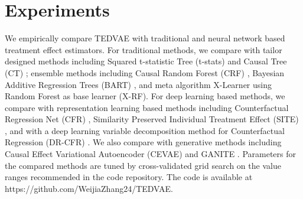 \documentclass[letterpaper]{article} %
\begin{document}
\section*{Experiments}
We empirically compare TEDVAE with traditional and neural network based treatment effect estimators.
For traditional methods, we compare with tailor designed methods including Squared t-statistic Tree (t-stats) \cite{Su2009} and Causal Tree (CT) \cite{Athey2015}; ensemble methods including Causal Random Forest (CRF) \cite{Wager2018}, Bayesian Additive Regression Trees (BART) \cite{Hill2011}, and meta algorithm X-Learner \cite{Kuenzel2019} using Random Forest \cite{Breiman1984} as base learner (X-RF).
For deep learning based methods, we compare with representation learning based methods including Counterfactual Regression Net (CFR) \cite{Shalit2016},
Similarity Preserved Individual Treatment Effect (SITE) \cite{Yao2018_Twin}, and with a deep learning variable decomposition method for Counterfactual Regression (DR-CFR) \cite{Hassanpour2020}.
We also compare with generative methods including Causal Effect Variational Autoencoder (CEVAE) \cite{Louizos2017} and GANITE \cite{Yoon2018}.
Parameters for the compared methods are tuned by cross-validated grid search on the value ranges recommended in the code repository. The code is available at https://github.com/WeijiaZhang24/TEDVAE.
\end{document}
